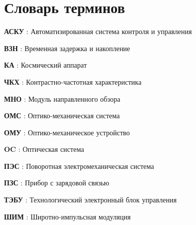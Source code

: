 \chapter*{Словарь терминов}             %



\textbf{АСКУ} : Автоматизированная система контроля и управления

\textbf{ВЗН} : Временная задержка и накопление

\textbf {КА} : Космический аппарат

\textbf {ЧКХ} : Контрастно-частотная характеристика

\textbf {МНО} : Модуль направленного обзора

\textbf {ОМС} : Оптико-механическая система

\textbf {ОМУ} : Оптико-механическое  устройство


\textbf {OC} : Оптическая система

\textbf {ПЭС} : Поворотная электромеханическая система

\textbf {ПЗС} : Прибор с зарядовой связью

\textbf {ТЭБУ} : Технологический электронный блок управления 

\textbf {ШИМ} : Широтно-импульсная модуляция



